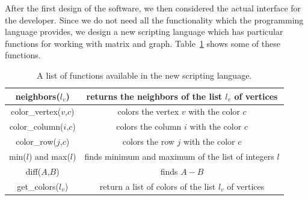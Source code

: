 \documentclass[12pt, twoside,a4paper,toc=bibliography]{scrbook}
\begin{document}
After the first design of the software, we then considered the actual interface
for the developer. Since we do not need all the functionality which the
programming language provides, we design a new scripting language which
has particular functions for working with matrix and graph.
Table~\ref{command-table} shows some of these functions.
\begin{table}
\begin{tabular}{ | c | c |}
\hline
neighbors($l_v$) & returns the neighbors of the list $l_v$ of vertices \\ \hline
color\_vertex($v$,$c$) & colors the vertex $v$ with the color $c$ \\\hline
color\_column($i$,$c$) & colors the column $i$ with the color $c$ \\\hline
color\_row($j$,$c$) & colors the row $j$ with the color $c$ \\\hline
min($l$) and max($l$) & finds minimum and maximum of the list of integers $l$ \\\hline
diff($A$,$B$) & finds $A - B$ \\\hline
get\_colors($l_v$) & return a list of colors of the list $l_v$ of vertices\\\hline
\end{tabular}
\caption{A list of functions available in the new scripting language.}
\label{command-table}
\end{table}
\end{document}
